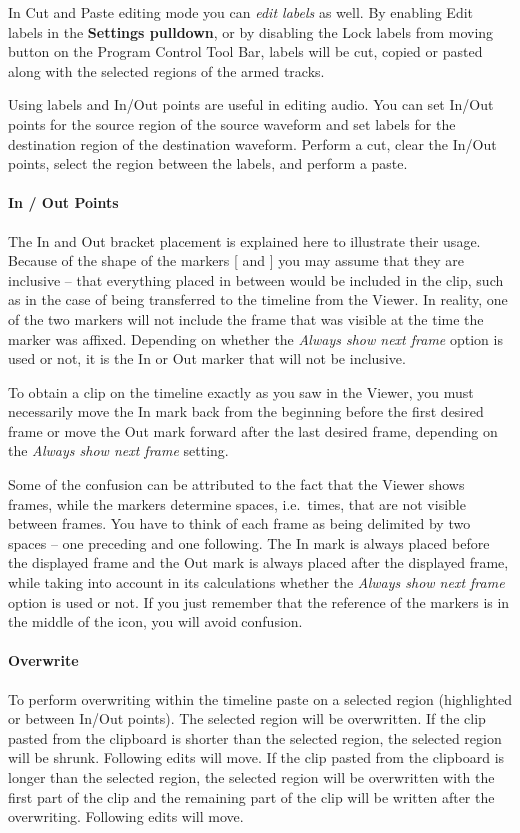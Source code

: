 In Cut and Paste editing mode you can \textit{edit labels} as
well. By enabling Edit labels in the \textbf{Settings pulldown}, or
by disabling the Lock labels from moving button on the Program
Control Tool Bar, labels will be cut, copied or pasted along with
the selected regions of the armed tracks.

Using labels and In/Out points are useful in editing audio.  You can
set In/Out points for the source region of the source waveform and
set labels for the destination region of the destination
waveform. Perform a cut, clear the In/Out points, select the region
between the labels, and perform a paste.

\paragraph{In / Out Points} The In and Out bracket placement is
explained here to illustrate their usage.  Because of the shape of
the markers [ and ] you may assume that they are inclusive -- that
everything placed in between would be included in the clip, such as
in the case of being transferred to the timeline from the Viewer.
In reality, one of the two markers will not include the frame that
was visible at the time the marker was affixed. Depending on whether
the \textit{Always show next frame} option is used or not, it is the
In or Out marker that will not be inclusive.

To obtain a clip on the timeline exactly as you saw in the Viewer,
you must necessarily move the In mark back from the beginning before
the first desired frame or move the Out mark forward after the last
desired frame, depending on the \textit{Always show next frame}
setting.

Some of the confusion can be attributed to the fact that the Viewer
shows frames, while the markers determine spaces, i.e.\ times, that
are not visible between frames. You have to think of each frame as
being delimited by two spaces -- one preceding and one following.
The In mark is always placed before the displayed frame and the Out
mark is always placed after the displayed frame, while taking into
account in its calculations whether the \textit{Always show next
  frame }option is used or not. If you just remember that the
reference of the markers is in the middle of the icon, you will
avoid confusion.

\paragraph{Overwrite} To perform overwriting within the timeline
paste on a selected region (highlighted or between In/Out
points). The selected region will be overwritten. If the clip pasted
from the clipboard is shorter than the selected region, the selected
region will be shrunk. Following edits will move. If the clip pasted
from the clipboard is longer than the selected region, the selected
region will be overwritten with the first part of the clip and the
remaining part of the clip will be written after the
overwriting. Following edits will move.

